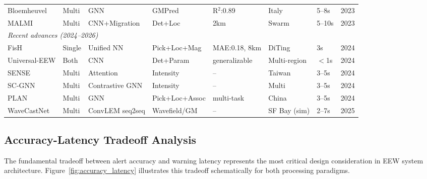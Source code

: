 \documentclass[review,authoryear]{elsarticle}
\begin{document}
\begin{longtable}{p{2.2cm}p{1.2cm}p{1.8cm}p{1.5cm}p{1.5cm}p{1.3cm}p{1.0cm}p{1.0cm}}
Bloemheuvel & Multi & GNN & GMPred & R$^2$:0.89 & Italy & 5--8s & 2023 \\
MALMI & Multi & CNN+Migration & Det+Loc & 2km & Swarm & 5--10s & 2023 \\
\midrule
\multicolumn{8}{l}{\textit{Recent advances (2024--2026)}} \\
\midrule
FisH & Single & Unified NN & Pick+Loc+Mag & MAE:0.18, 8km & DiTing & 3s & 2024 \\
Universal-EEW & Both & CNN & Det+Param & generalizable & Multi-region & $<$1s & 2024 \\
SENSE & Multi & Attention & Intensity & -- & Taiwan & 3--5s & 2024 \\
SC-GNN & Multi & Contrastive GNN & Intensity & -- & Multi & 3--5s & 2024 \\
PLAN & Multi & GNN & Pick+Loc+Assoc & multi-task & China & 3--5s & 2024 \\
WaveCastNet & Multi & ConvLEM seq2seq & Wavefield/GM & -- & SF Bay (sim) & 2--7s & 2025 \\
\end{longtable}

\subsection{Accuracy-Latency Tradeoff Analysis}

The fundamental tradeoff between alert accuracy and warning latency represents the most critical design consideration in EEW system architecture. Figure~\ref{fig:accuracy_latency} illustrates this tradeoff schematically for both processing paradigms.
\end{document}
